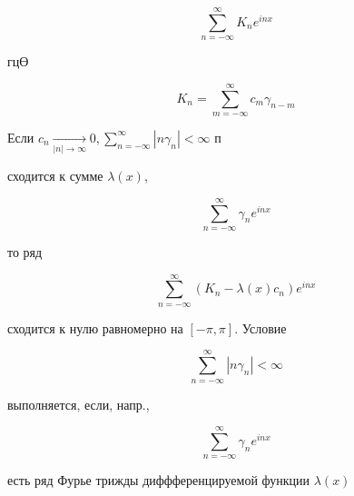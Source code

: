 \documentclass[10pt]{article}
\begin{document}
\[

\sum_{n=-\infty}^{\infty} K_{n} e^{i n x}

\]



гцӨ



\[

K_{n}=\sum_{m=-\infty}^{\infty} c_{m} \gamma_{n-m}

\]



Если $c_{n} \underset{|n| \rightarrow \infty}{\longrightarrow} 0, \sum_{n=-\infty}^{\infty}\left|n \gamma_{n}\right|<\infty$ п



сходится к сумме $\lambda(x)$,



\[

\sum_{n=-\infty}^{\infty} \gamma_{n} e^{i n x}

\]



то ряд



\[

\sum_{n=-\infty}^{\infty}\left(K_{n}-\lambda(x) c_{n}\right) e^{i n x}

\]



сходится к нулю равномерно на $[-\pi, \pi]$. Условие



\[

\sum_{n=-\infty}^{\infty}\left|n \gamma_{n}\right|<\infty

\]



выполняется, если, напр.,



\[

\sum_{n=-\infty}^{\infty} \gamma_{n} e^{i n x}

\]



есть ряд Фурье трижды диффференцируемой функции $\lambda(x)$
\end{document}

